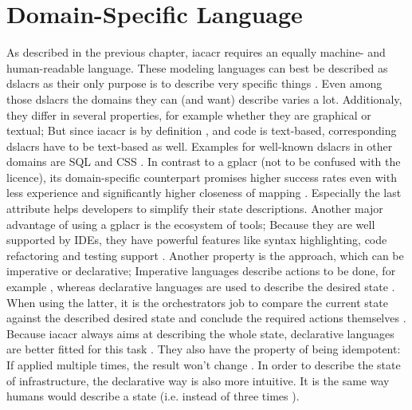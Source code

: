 

\section{Domain-Specific Language} %
As described in the previous chapter, \gls{iacacr} requires an equally machine- and human-readable language. These modeling languages can best be described as \gls{dslacr}s as their only purpose is to describe very specific things \cite{dsl_web_app}. Even among those \gls{dslacr}s the domains they can (and want) describe varies a lot. Additionaly, they differ in several properties, for example whether they are graphical or textual; But since \gls{iacacr} is by definition , and code is text-based, corresponding \gls{dslacr}s have to be text-based as well. Examples for well-known \gls{dslacr}s in other domains are SQL and CSS \cite{dsl_slides}.
\newline
In contrast to a \gls{gplacr} (not to be confused with the licence), its domain-specific counterpart promises higher success rates even with less experience and significantly higher closeness of mapping \cite{comparing_gpl_dsl}. Especially the last attribute helps developers to simplify their state descriptions. Another major advantage of using a \gls{gplacr} is the ecosystem of tools; Because they are well supported by IDEs, they have powerful features like syntax highlighting, code refactoring and testing support \cite{iac_oreilly}.
\newline
Another property is the approach, which can be imperative or declarative; Imperative languages describe actions to be done, for example , whereas declarative languages are used to describe the desired state . When using the latter, it is the orchestrators job to compare the current state against the described desired state and conclude the required actions themselves \cite{dsl_for_iac}.
Because \gls{iacacr} always aims at describing the whole state, declarative languages are better fitted for this task \cite{iac_oreilly}. They also have the property of being idempotent: If applied multiple times, the result won't change \cite{iac_oreilly}. In order to describe the state of infrastructure, the declarative way is also more intuitive. It is the same way humans would describe a state (i.e.  instead of three times ).
